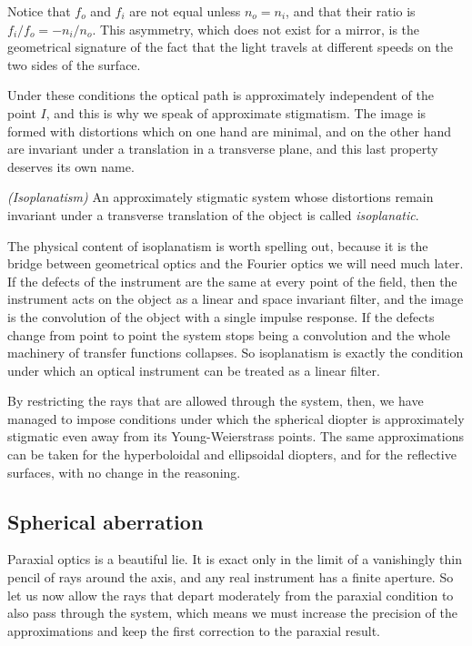                 Notice that $f_o$ and $f_i$ are not equal unless $n_o=n_i$, and that their ratio is $f_i/f_o = -n_i/n_o$. This asymmetry, which does not exist for a mirror, is the geometrical signature of the fact that the light travels at different speeds on the two sides of the surface.

                Under these conditions the optical path is approximately independent of the point $I$, and this is why we speak of approximate stigmatism. The image is formed with distortions which on one hand are minimal, and on the other hand are invariant under a translation in a transverse plane, and this last property deserves its own name.

                \begin{myDef}
                    \textit{(Isoplanatism)} An approximately stigmatic system whose distortions remain invariant under a transverse translation of the object is called \emph{isoplanatic}.
                \end{myDef}

                The physical content of isoplanatism is worth spelling out, because it is the bridge between geometrical optics and the Fourier optics we will need much later. If the defects of the instrument are the same at every point of the field, then the instrument acts on the object as a linear and space invariant filter, and the image is the convolution of the object with a single impulse response. If the defects change from point to point the system stops being a convolution and the whole machinery of transfer functions collapses. So isoplanatism is exactly the condition under which an optical instrument can be treated as a linear filter.

                By restricting the rays that are allowed through the system, then, we have managed to impose conditions under which the spherical diopter is approximately stigmatic even away from its Young-Weierstrass points. The same approximations can be taken for the hyperboloidal and ellipsoidal diopters, and for the reflective surfaces, with no change in the reasoning.

            \subsection{Spherical aberration}

                Paraxial optics is a beautiful lie. It is exact only in the limit of a vanishingly thin pencil of rays around the axis, and any real instrument has a finite aperture. So let us now allow the rays that depart moderately from the paraxial condition to also pass through the system, which means we must increase the precision of the approximations and keep the first correction to the paraxial result.

